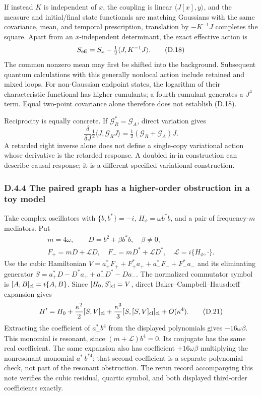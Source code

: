\documentclass[a4paper,11pt]{article}
\numberwithin{equation}{section}
\begin{document}
If instead \(K\) is independent of \(x\), the coupling is linear \(\langle J[x],y\rangle\), and the measure and initial/final state functionals are matching Gaussians with the same covariance, mean, and temporal prescription, translation by \(-K^{-1}J\) completes the square. Apart from an \(x\)-independent determinant, the exact effective action is \[
S_{\rm eff}=S_x-\tfrac12\langle J,K^{-1}J\rangle.
\tag{D.18}
\] The common nonzero mean may first be shifted into the background. Subsequent quantum calculations with this generally nonlocal action include retained and mixed loops. For non-Gaussian endpoint states, the logarithm of their characteristic functional has higher cumulants; a fourth cumulant generates a \(J^4\) term. Equal two-point covariance alone therefore does not establish (D.18).

Reciprocity is equally concrete. If \(\mathcal G_R^*=\mathcal G_A\), direct variation gives \[
\frac{\delta}{\delta J}
\tfrac12\langle J,\mathcal G_RJ\rangle
=\tfrac12(\mathcal G_R+\mathcal G_A)J.
\tag{D.19}
\] A retarded right inverse alone does not define a single-copy variational action whose derivative is the retarded response. A doubled in-in construction can describe causal response; it is a different specified variational construction.

\hypertarget{d.4.4-the-paired-graph-has-a-higher-order-obstruction-in-a-toy-model}{%
\subsubsection{D.4.4 The paired graph has a higher-order obstruction in a toy model}\label{d.4.4-the-paired-graph-has-a-higher-order-obstruction-in-a-toy-model}}

Take complex oscillators with \(\{b,b^*\}=-i\), \(H_\phi=\omega b^*b\), and a pair of frequency-\(m\) mediators. Put \[
\begin{gathered}
m=4\omega,\qquad D=b^2+\beta b^*b,\quad \beta\ne0,\\
F_+=mD+\mathscr LD,\quad F_-=mD^*+\mathscr LD^*,
\quad \mathscr L=i\{H_\phi,\cdot\}.
\end{gathered}
\tag{D.20}
\] Use the cubic Hamiltonian \(V=a_+^*F_++F_+^*a_++a_-^*F_-+F_-^*a_-\) and its eliminating generator \(S=a_+^*D-D^*a_++a_-^*D^*-Da_-\). The normalized commutator symbol is \([A,B]_{\rm cl}=i\{A,B\}\). Since \([H_0,S]_{\rm cl}=V\), direct Baker--Campbell--Hausdorff expansion gives \[
H'=H_0+\frac{\kappa^2}{2}[S,V]_{\rm cl}
+\frac{\kappa^3}{3}[S,[S,V]_{\rm cl}]_{\rm cl}
+O(\kappa^4).
\tag{D.21}
\] Extracting the coefficient of \(a_+^*b^4\) from the displayed polynomials gives \(-16\omega\beta\). This monomial is resonant, since \((m+\mathscr L)b^4=0\). Its conjugate has the same real coefficient. The same expansion also has coefficient \(+16\omega\beta\) multiplying the nonresonant monomial \(a_-^*b^{*4}\); that second coefficient is a separate polynomial check, not part of the resonant obstruction. The rerun record accompanying this note verifies the cubic residual, quartic symbol, and both displayed third-order coefficients exactly.
\end{document}
